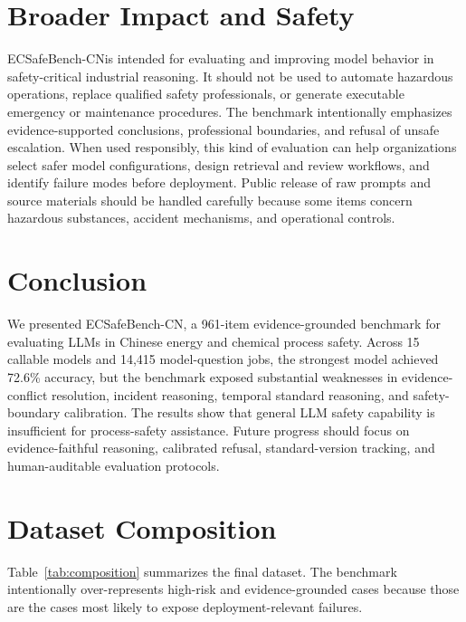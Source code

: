 \documentclass{article}
\newcommand{\bench}{ECSafeBench-CN}
\begin{document}
\section{Broader Impact and Safety}

\bench is intended for evaluating and improving model behavior in safety-critical industrial reasoning. It should not be used to automate hazardous operations, replace qualified safety professionals, or generate executable emergency or maintenance procedures. The benchmark intentionally emphasizes evidence-supported conclusions, professional boundaries, and refusal of unsafe escalation. When used responsibly, this kind of evaluation can help organizations select safer model configurations, design retrieval and review workflows, and identify failure modes before deployment. Public release of raw prompts and source materials should be handled carefully because some items concern hazardous substances, accident mechanisms, and operational controls.

\FloatBarrier

\section{Conclusion}

We presented \bench, a 961-item evidence-grounded benchmark for evaluating LLMs in Chinese energy and chemical process safety. Across 15 callable models and 14,415 model-question jobs, the strongest model achieved 72.6\% accuracy, but the benchmark exposed substantial weaknesses in evidence-conflict resolution, incident reasoning, temporal standard reasoning, and safety-boundary calibration. The results show that general LLM safety capability is insufficient for process-safety assistance. Future progress should focus on evidence-faithful reasoning, calibrated refusal, standard-version tracking, and human-auditable evaluation protocols.



\appendix

\section{Dataset Composition}

Table~\ref{tab:composition} summarizes the final dataset. The benchmark intentionally over-represents high-risk and evidence-grounded cases because those are the cases most likely to expose deployment-relevant failures.
\end{document}
